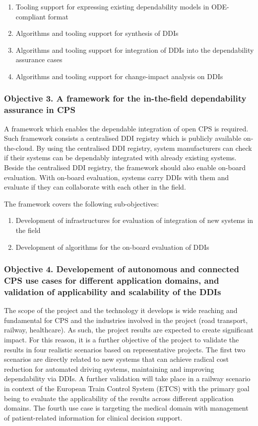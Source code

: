 \begin{enumerate}
	\item Tooling support for expressing existing dependability models in ODE-compliant format
	\item Algorithms and tooling support for synthesis of DDIs
	\item Algorithms and tooling support for integration of DDIs into the dependability assurance cases
	\item Algorithms and tooling support for change-impact analysis on DDIs
\end{enumerate}

\subsubsection{Objective 3. A framework for the in-the-field dependability assurance in CPS}
A framework which enables the dependable integration of open CPS is required. Such framework consists a centralised DDI registry which is publicly available on-the-cloud. By using the centralised DDI registry, system manufacturers can check if their systems can be dependably integrated with already existing systems. Beside the centralised DDI registry, the framework should also enable on-board evaluation. With on-board evaluation, systems carry DDIs with them and evaluate if they can collaborate with each other in the field.

The framework covers the following sub-objectives:

\begin{enumerate}
	\item Development of infrastructures for evaluation of integration of new systems in the field
	\item Development of algorithms for the on-board evaluation of DDIs
\end{enumerate}

\subsubsection{Objective 4. Developement of autonomous and connected CPS use cases for different application domains, and validation of applicability and scalability of the DDIs}
The scope of the project and the technology it develops is wide reaching and fundamental for CPS and the industries involved in the project (road transport, railway, healthcare). As such, the project results are expected to create significant impact. For this reason, it is a further objective of the project to validate the results in four realistic scenarios based on representative projects. The first two scenarios are directly related to new systems that can achieve radical cost reduction for automated driving systems, maintaining and improving dependability via DDIs. A further validation will take place in a railway scenario in context of the European Train Control System (ETCS) with the primary goal being to evaluate the applicability of the results across different application domains. The fourth use case is targeting the medical domain with management of patient-related information for clinical decision support.

